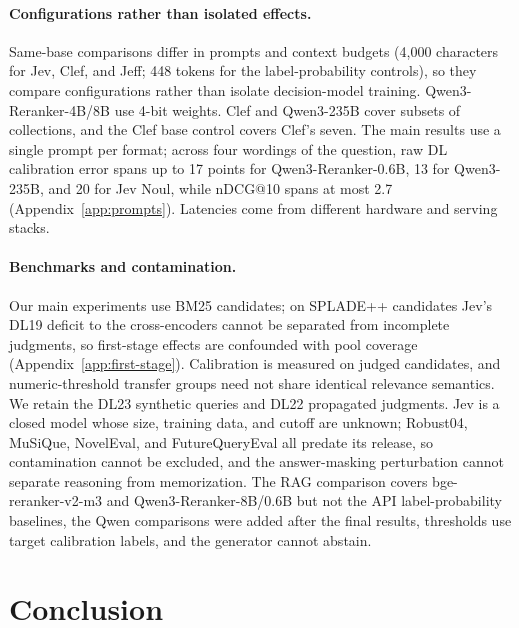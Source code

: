 \paragraph{Configurations rather than isolated effects.}
Same-base comparisons differ in prompts and context budgets (4{,}000 characters for Jev, Clef, and Jeff; 448 tokens for the label-probability controls), so they compare configurations rather than isolate decision-model training. Qwen3-Reranker-4B/8B use 4-bit weights. Clef and Qwen3-235B cover subsets of collections, and the Clef base control covers Clef's seven. The main results use a single prompt per format; across four wordings of the question, raw DL calibration error spans up to 17 points for Qwen3-Reranker-0.6B, 13 for Qwen3-235B, and 20 for Jev Noul, while nDCG@10 spans at most 2.7 (Appendix~\ref{app:prompts}). Latencies come from different hardware and serving stacks.

\paragraph{Benchmarks and contamination.}
Our main experiments use BM25 candidates; on SPLADE++ candidates Jev's DL19 deficit to the cross-encoders cannot be separated from incomplete judgments, so first-stage effects are confounded with pool coverage (Appendix~\ref{app:first-stage}). Calibration is measured on judged candidates, and numeric-threshold transfer groups need not share identical relevance semantics. We retain the DL23 synthetic queries and DL22 propagated judgments. Jev is a closed model whose size, training data, and cutoff are unknown; Robust04, MuSiQue, NovelEval, and FutureQueryEval all predate its release, so contamination cannot be excluded, and the answer-masking perturbation cannot separate reasoning from memorization. The RAG comparison covers bge-reranker-v2-m3 and Qwen3-Reranker-8B/0.6B but not the API label-probability baselines, the Qwen comparisons were added after the final results, thresholds use target calibration labels, and the generator cannot abstain.

\section{Conclusion}

